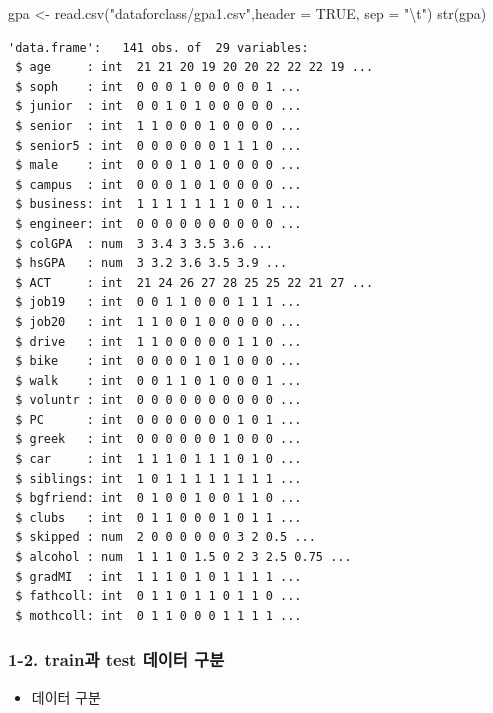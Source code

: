 \documentclass[
  letterpaper,
  DIV=11,
  numbers=noendperiod]{scrartcl}
\newenvironment{Shaded}{\begin{snugshade}}{\end{snugshade}}
\newcommand{\AttributeTok}[1]{\textcolor[rgb]{0.40,0.45,0.13}{#1}}
\newcommand{\ConstantTok}[1]{\textcolor[rgb]{0.56,0.35,0.01}{#1}}
\newcommand{\FloatTok}[1]{\textcolor[rgb]{0.68,0.00,0.00}{#1}}
\newcommand{\FunctionTok}[1]{\textcolor[rgb]{0.28,0.35,0.67}{#1}}
\newcommand{\NormalTok}[1]{\textcolor[rgb]{0.00,0.23,0.31}{#1}}
\newcommand{\OtherTok}[1]{\textcolor[rgb]{0.00,0.23,0.31}{#1}}
\newcommand{\SpecialCharTok}[1]{\textcolor[rgb]{0.37,0.37,0.37}{#1}}
\newcommand{\StringTok}[1]{\textcolor[rgb]{0.13,0.47,0.30}{#1}}
\providecommand{\tightlist}{%
  \setlength{\itemsep}{0pt}\setlength{\parskip}{0pt}}\usepackage{longtable,booktabs,array}
\begin{document}
\begin{Shaded}
\begin{Highlighting}[]
\NormalTok{gpa }\OtherTok{\textless{}{-}} \FunctionTok{read.csv}\NormalTok{(}\StringTok{"dataforclass/gpa1.csv"}\NormalTok{,}\AttributeTok{header =} \ConstantTok{TRUE}\NormalTok{,}
                \AttributeTok{sep =} \StringTok{"}\SpecialCharTok{\textbackslash{}t}\StringTok{"}\NormalTok{)}
\FunctionTok{str}\NormalTok{(gpa)}
\end{Highlighting}
\end{Shaded}

\begin{verbatim}
'data.frame':   141 obs. of  29 variables:
 $ age     : int  21 21 20 19 20 20 22 22 22 19 ...
 $ soph    : int  0 0 0 1 0 0 0 0 0 1 ...
 $ junior  : int  0 0 1 0 1 0 0 0 0 0 ...
 $ senior  : int  1 1 0 0 0 1 0 0 0 0 ...
 $ senior5 : int  0 0 0 0 0 0 1 1 1 0 ...
 $ male    : int  0 0 0 1 0 1 0 0 0 0 ...
 $ campus  : int  0 0 0 1 0 1 0 0 0 0 ...
 $ business: int  1 1 1 1 1 1 1 0 0 1 ...
 $ engineer: int  0 0 0 0 0 0 0 0 0 0 ...
 $ colGPA  : num  3 3.4 3 3.5 3.6 ...
 $ hsGPA   : num  3 3.2 3.6 3.5 3.9 ...
 $ ACT     : int  21 24 26 27 28 25 25 22 21 27 ...
 $ job19   : int  0 0 1 1 0 0 0 1 1 1 ...
 $ job20   : int  1 1 0 0 1 0 0 0 0 0 ...
 $ drive   : int  1 1 0 0 0 0 0 1 1 0 ...
 $ bike    : int  0 0 0 0 1 0 1 0 0 0 ...
 $ walk    : int  0 0 1 1 0 1 0 0 0 1 ...
 $ voluntr : int  0 0 0 0 0 0 0 0 0 0 ...
 $ PC      : int  0 0 0 0 0 0 0 1 0 1 ...
 $ greek   : int  0 0 0 0 0 0 1 0 0 0 ...
 $ car     : int  1 1 1 0 1 1 1 0 1 0 ...
 $ siblings: int  1 0 1 1 1 1 1 1 1 1 ...
 $ bgfriend: int  0 1 0 0 1 0 0 1 1 0 ...
 $ clubs   : int  0 1 1 0 0 0 1 0 1 1 ...
 $ skipped : num  2 0 0 0 0 0 0 3 2 0.5 ...
 $ alcohol : num  1 1 1 0 1.5 0 2 3 2.5 0.75 ...
 $ gradMI  : int  1 1 1 0 1 0 1 1 1 1 ...
 $ fathcoll: int  0 1 1 0 1 1 0 1 1 0 ...
 $ mothcoll: int  0 1 1 0 0 0 1 1 1 1 ...
\end{verbatim}

\subsubsection{1-2. train과 test 데이터
구분}\label{trainuxacfc-test-uxb370uxc774uxd130-uxad6cuxbd84}

\begin{itemize}
\tightlist
\item
  데이터 구분
\end{itemize}

\begin{Shaded}
\end{Shaded}
\end{document}
